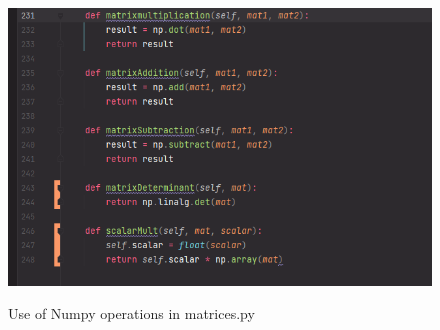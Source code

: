 \documentclass[final]{cmpreport}
\begin{document}
	\begin{figure}[H]
		\caption{Use of Numpy operations in matrices.py}
		\centering
		\includegraphics[scale=0.7]{numpy.png}
		\label{fig:numpy}
	\end{figure}
\end{document}
